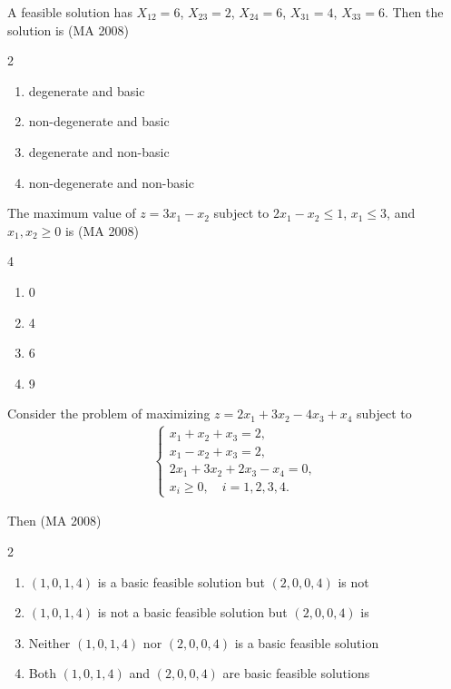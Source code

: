 A feasible solution has $X_{12} = 6$, $X_{23} = 2$, $X_{24} = 6$, $X_{31} = 4$, $X_{33} = 6$. Then the solution is
\hfill (MA 2008)
\begin{multicols}{2}
\begin{enumerate}
    \item degenerate and basic
    \item non-degenerate and basic
    \item degenerate and non-basic
    \item non-degenerate and non-basic
\end{enumerate}
\end{multicols}

\item
The maximum value of $z = 3x_1 - x_2$ subject to $2x_1 - x_2 \leq 1$, $x_1 \leq 3$, and $x_1, x_2 \geq 0$ is
\hfill (MA 2008)
\begin{multicols}{4}
\begin{enumerate}
    \item 0
    \item 4
    \item 6
    \item 9
\end{enumerate}
\end{multicols}

\item
Consider the problem of maximizing $z = 2x_1 + 3x_2 - 4x_3 + x_4$ subject to
\begin{align}
    \begin{cases}
x_1 + x_2 + x_3 = 2, \\
x_1 - x_2 + x_3 = 2, \\
2x_1 + 3x_2 + 2x_3 - x_4 = 0, \\
x_i \geq 0, \quad i=1,2,3,4.
\end{cases}
\end{align}


Then
\hfill (MA 2008)
\begin{multicols}{2}
\begin{enumerate}
    \item $(1,0,1,4)$ is a basic feasible solution but $(2,0,0,4)$ is not
    \item $(1,0,1,4)$ is not a basic feasible solution but $(2,0,0,4)$ is
    \item Neither $(1,0,1,4)$ nor $(2,0,0,4)$ is a basic feasible solution
    \item Both $(1,0,1,4)$ and $(2,0,0,4)$ are basic feasible solutions
\end{enumerate}
\end{multicols}

